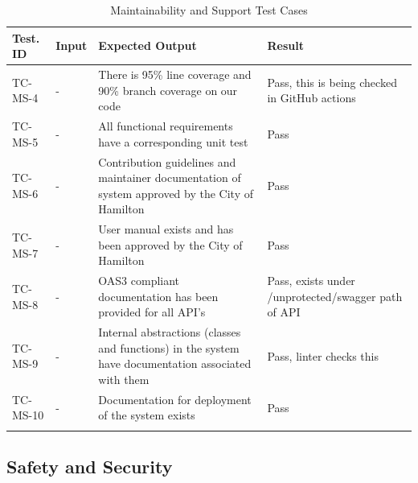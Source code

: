 \documentclass[12pt, titlepage]{article}
\begin{document}
\begin{longtable}{|m{2cm}|m{1cm}|m{6cm}|m{3cm}|}
  \hline
  \textbf{Test. ID} & \textbf{Input} & \textbf{Expected Output} &
  \textbf{Result} \\
  \hline
  TC-MS-4 & - & There is 95\% line coverage and 90\% branch coverage
  on our code & Pass, this is being checked in GitHub actions\\ \hline
  TC-MS-5 & - & All functional requirements have a corresponding unit
  test & Pass\\ \hline
  TC-MS-6 & - & Contribution guidelines and maintainer documentation
  of system approved by the City of Hamilton & Pass\\ \hline
  TC-MS-7 & - & User manual exists and has been approved by the City
  of Hamilton & Pass\\ \hline
  TC-MS-8 & - & OAS3 compliant documentation has been provided for
  all API's & Pass, exists under /unprotected/swagger path of API\\ \hline
  TC-MS-9 & - & Internal abstractions (classes and functions) in the
  system have documentation associated with them & Pass, linter
  checks this\\ \hline
  TC-MS-10 & - & Documentation for deployment of the system exists &
  Pass\\ \hline
  \caption{Maintainability and Support Test Cases}
\end{longtable}

\subsection{Safety and Security}
\end{document}
